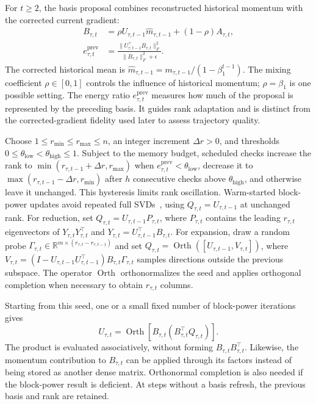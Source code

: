 \documentclass[fleqn,10pt]{wlscirep}
\begin{document}
For $t\geq2$, the basis proposal combines reconstructed historical momentum with the corrected current gradient:
\begin{equation}
\begin{aligned}
B_{\tau,t}
&=\rho U_{\tau,t-1}\widehat m_{\tau,t-1}
 +(1-\rho)A_{\tau,t},\\
e_{\tau,t}^{\mathrm{prev}}
&=\frac{\|U_{\tau,t-1}^{\top}B_{\tau,t}\|_F^2}
{\|B_{\tau,t}\|_F^2+\epsilon}.
\end{aligned}
\label{eq:momentum_gradient_barycenter}
\end{equation}
The corrected historical mean is $\widehat m_{\tau,t-1}=m_{\tau,t-1}/(1-\beta_1^{t-1})$. The mixing coefficient $\rho\in[0,1]$ controls the influence of historical momentum; $\rho=\beta_1$ is one possible setting. The energy ratio $e_{\tau,t}^{\mathrm{prev}}$ measures how much of the proposal is represented by the preceding basis. It guides rank adaptation and is distinct from the corrected-gradient fidelity used later to assess trajectory quality.

Choose $1\leq r_{\min}\leq r_{\max}\leq n$, an integer increment $\Delta r>0$, and thresholds $0\leq\theta_{\mathrm{low}}<\theta_{\mathrm{high}}\leq1$. Subject to the memory budget, scheduled checks increase the rank to $\min(r_{\tau,t-1}+\Delta r,r_{\max})$ when $e_{\tau,t}^{\mathrm{prev}}<\theta_{\mathrm{low}}$, decrease it to $\max(r_{\tau,t-1}-\Delta r,r_{\min})$ after $h$ consecutive checks above $\theta_{\mathrm{high}}$, and otherwise leave it unchanged. This hysteresis limits rank oscillation. Warm-started block-power updates avoid repeated full SVDs~\cite{galore2024,rgp2024,qgalore2025,ldadam2025}, using $Q_{\tau,t}=U_{\tau,t-1}$ at unchanged rank. For reduction, set $Q_{\tau,t}=U_{\tau,t-1}P_{\tau,t}$, where $P_{\tau,t}$ contains the leading $r_{\tau,t}$ eigenvectors of $Y_{\tau,t}Y_{\tau,t}^{\top}$ and $Y_{\tau,t}=U_{\tau,t-1}^{\top}B_{\tau,t}$. For expansion, draw a random probe $\Gamma_{\tau,t}\in\mathbb{R}^{m\times(r_{\tau,t}-r_{\tau,t-1})}$ and set $Q_{\tau,t}=\operatorname{Orth}([U_{\tau,t-1},V_{\tau,t}])$, where $V_{\tau,t}=(I-U_{\tau,t-1}U_{\tau,t-1}^{\top})B_{\tau,t}\Gamma_{\tau,t}$ samples directions outside the previous subspace. The operator $\operatorname{Orth}$ orthonormalizes the seed and applies orthogonal completion when necessary to obtain $r_{\tau,t}$ columns.


Starting from this seed, one or a small fixed number of block-power iterations gives
\begin{equation}
U_{\tau,t}
=\operatorname{Orth}\!\left[B_{\tau,t}
\left(B_{\tau,t}^{\top}Q_{\tau,t}\right)\right].
\label{eq:dynamic_basis}
\end{equation}
The product is evaluated associatively, without forming $B_{\tau,t}B_{\tau,t}^{\top}$. Likewise, the momentum contribution to $B_{\tau,t}$ can be applied through its factors instead of being stored as another dense matrix. Orthonormal completion is also needed if the block-power result is deficient. At steps without a basis refresh, the previous basis and rank are retained.
\end{document}
